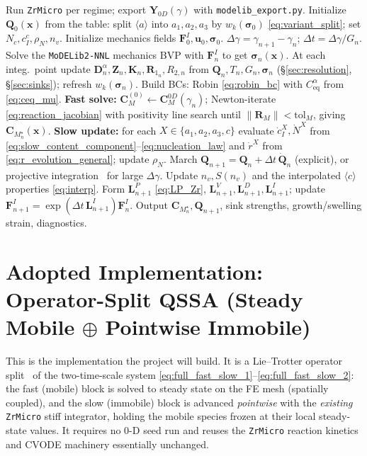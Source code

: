 \documentclass[11pt]{article}
\newcommand{\CM}{\mathbf{C}_{M}}
\newcommand{\Kmat}{\mathbf{K}}
\newcommand{\Rone}{\mathbf{R}_{1}}
\newcommand{\sig}{\bm{\sigma}}
\newcommand{\dt}{\Delta t}
\newcommand{\dg}{\Delta \gamma}
\newcommand{\ZrMicro}{\texttt{ZrMicro}}
\newcommand{\MoDELib}{\texttt{MoDELib2-NNL}}
\newcommand{\code}[1]{\texttt{#1}}
\begin{document}
\begin{algorithm}[h!]
\caption{Two-time-scale coupled SR-CD march (\ZrMicro{} kinetics, \MoDELib{} FEM)}
\begin{algorithmic}[1]
\State Run \ZrMicro{} per regime; export $\mathbf Y_{0D}(\gamma)$ with \code{modelib\_export.py}.
\State Initialize $\mathbf Q_0(\mathbf x)$ from the table: split $\langle a\rangle$ into $a_1,a_2,a_3$ by $w_k(\sig_0)$ \eqref{eq:variant_split}; set $N_c,c^c_I,\rho_N,n_v$.
\State Initialize mechanics fields $\mathbf F^I_0,\mathbf u_0,\sig_0$.
    \State $\dg=\gamma_{n+1}-\gamma_n$;\; $\dt=\dg/G_n$.
    \State Solve the \MoDELib{} mechanics BVP with $\mathbf F^I_n$ to get $\sig_n(\mathbf x)$.
    \State At each integ.\ point update $\mathbf D^\alpha_n,\mathbf Z_n,\Kmat_n,\Rone_n,R_{2,n}$ from $\mathbf Q_n,T_n,G_n,\sig_n$ (\S\ref{sec:resolution}, \S\ref{sec:sinks}); refresh $w_k(\sig_n)$.
    \State Build BCs: Robin \eqref{eq:robin_bc} with $C^\alpha_{\mathrm{eq}}$ from \eqref{eq:ceq_mu}.
    \State \textbf{Fast solve:} $\CM^{(0)}\leftarrow\CM^{0D}(\gamma_n)$; Newton-iterate \eqref{eq:reaction_jacobian} with positivity line search until $\|\mathbf R_M\|<\mathrm{tol}_M$, giving $\CM_n^\star(\mathbf x)$.
    \State \textbf{Slow update:} for each $X\in\{a_1,a_2,a_3,c\}$ evaluate $\dot c^{X}_I,\dot N^{X}$ from \eqref{eq:slow_content_component}--\eqref{eq:nucleation_law} and $\dot r^{X}$ from \eqref{eq:r_evolution_general}; update $\rho_N$.
    \State March $\mathbf Q_{n+1}=\mathbf Q_n+\dt\,\dot{\mathbf Q}_n$ (explicit), or projective integration~\cite{GearKevrekidis2003} for large $\dg$.
    \State Update $n_v,S(n_v)$ and the interpolated $\langle c\rangle$ properties \eqref{eq:interp}.
    \State Form $\mathbf L^P_{n+1}$ \eqref{eq:LP_Zr}, $\mathbf L^V_{n+1},\mathbf L^D_{n+1},\mathbf L^I_{n+1}$; update $\mathbf F^I_{n+1}=\exp(\dt\,\mathbf L^I_{n+1})\mathbf F^I_n$.
    \State Output $\CM_n^\star,\mathbf Q_{n+1}$, sink strengths, growth/swelling strain, diagnostics.
\EndFor
\end{algorithmic}
\end{algorithm}

\section{Adopted Implementation: Operator-Split QSSA
(Steady Mobile $\oplus$ Pointwise Immobile)}
\label{sec:opsplit}

This is the implementation the project will build. It is a Lie--Trotter operator
split~\cite{Strang1968} of the two-time-scale system \eqref{eq:full_fast_slow_1}--\eqref{eq:full_fast_slow_2}:
the fast (mobile) block is solved to steady state on the FE mesh (spatially
coupled), and the slow (immobile) block is advanced \emph{pointwise} with the
\emph{existing} \ZrMicro{} stiff integrator, holding the mobile species frozen at
their local steady-state values. It requires no 0-D seed run and reuses the
\ZrMicro{} reaction kinetics and CVODE machinery essentially unchanged.
\end{document}
